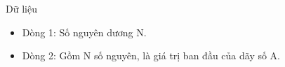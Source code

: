 Dữ liệu
\begin{itemize}
	\item     Dòng 1: Số nguyên dương N.   
	\item     Dòng 2: Gồm N số nguyên, là giá trị ban đầu của dãy số A.   
\end{itemize}